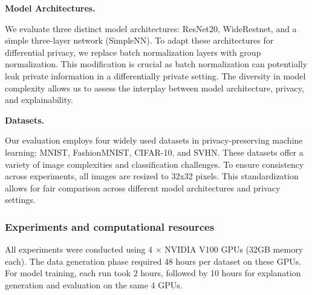 \documentclass{article}
\begin{document}
\textbf{Model Architectures.     } 

We evaluate three distinct model architectures: ResNet20, WideRestnet, and a simple three-layer network (SimpleNN). To adapt these architectures for differential privacy, we replace batch normalization layers with group normalization. This modification is crucial as batch normalization can potentially leak private information in a differentially private setting. The diversity in model complexity allows us to assess the interplay between model architecture, privacy, and explainability.

\textbf{Datasets.     } 

Our evaluation employs four widely used datasets in privacy-preserving machine learning: MNIST, FashionMNIST, CIFAR-10, and SVHN. These datasets offer a variety of image complexities and classification challenges. To ensure consistency across experiments, all images are resized to 32x32 pixels. This standardization allows for fair comparison across different model architectures and privacy settings.



\subsubsection{Experiments and computational resources} \label{app:resources}
All experiments were conducted using 4 × NVIDIA V100 GPUs (32GB memory each). The data generation phase required 48 hours per dataset on these GPUs. For model training, each run took 2 hours, followed by 10 hours for explanation generation and evaluation on the same 4 GPUs.





\end{document}
